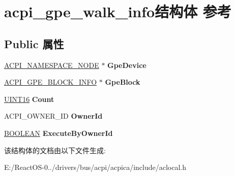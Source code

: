 \hypertarget{structacpi__gpe__walk__info}{}\section{acpi\+\_\+gpe\+\_\+walk\+\_\+info结构体 参考}
\label{structacpi__gpe__walk__info}
\subsection*{Public 属性}
\begin{DoxyCompactItemize}
\item 
\mbox{\label{structacpi__gpe__walk__info_a6e4e8b0a1c430358df1a74d85c889046}} 
\hyperlink{structacpi__namespace__node}{A\+C\+P\+I\+\_\+\+N\+A\+M\+E\+S\+P\+A\+C\+E\+\_\+\+N\+O\+DE} $\ast$ {\bfseries Gpe\+Device}
\item 
\mbox{\label{structacpi__gpe__walk__info_a5d078f984bd011b625e0a50cf715ff2d}} 
\hyperlink{structacpi__gpe__block__info}{A\+C\+P\+I\+\_\+\+G\+P\+E\+\_\+\+B\+L\+O\+C\+K\+\_\+\+I\+N\+FO} $\ast$ {\bfseries Gpe\+Block}
\item 
\mbox{\label{structacpi__gpe__walk__info_a6dacecb805d2e29cbf411b9c5d24cfd8}} 
\hyperlink{_processor_bind_8h_a09f1a1fb2293e33483cc8d44aefb1eb1}{U\+I\+N\+T16} {\bfseries Count}
\item 
\mbox{\label{structacpi__gpe__walk__info_afd6b91732645342856d99268453dc839}} 
A\+C\+P\+I\+\_\+\+O\+W\+N\+E\+R\+\_\+\+ID {\bfseries Owner\+Id}
\item 
\mbox{\label{structacpi__gpe__walk__info_ac3d85d6ba8bdbc38e00a99eb178523b3}} 
\hyperlink{_processor_bind_8h_a112e3146cb38b6ee95e64d85842e380a}{B\+O\+O\+L\+E\+AN} {\bfseries Execute\+By\+Owner\+Id}
\end{DoxyCompactItemize}


该结构体的文档由以下文件生成\+:\begin{DoxyCompactItemize}
\item 
E\+:/\+React\+O\+S-\/0../drivers/bus/acpi/acpica/include/aclocal.\+h\end{DoxyCompactItemize}
